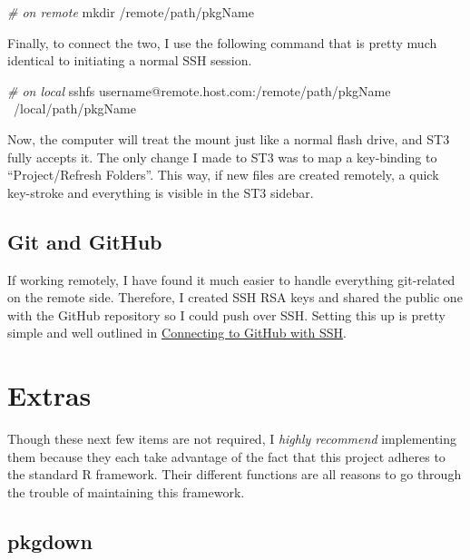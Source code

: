 \documentclass[]{book}
\newenvironment{Shaded}{\begin{snugshade}}{\end{snugshade}}
\newcommand{\CommentTok}[1]{\textcolor[rgb]{0.56,0.35,0.01}{\textit{#1}}}
\newcommand{\ExtensionTok}[1]{#1}
\newcommand{\FunctionTok}[1]{\textcolor[rgb]{0.00,0.00,0.00}{#1}}
\newcommand{\NormalTok}[1]{#1}
\begin{document}
\begin{Shaded}
\begin{Highlighting}[]
\CommentTok{# on remote}
\FunctionTok{mkdir}\NormalTok{ /remote/path/pkgName}
\end{Highlighting}
\end{Shaded}

Finally, to connect the two, I use the following command that is pretty much identical to initiating a normal SSH session.

\begin{Shaded}
\begin{Highlighting}[]
\CommentTok{# on local}
\ExtensionTok{sshfs}\NormalTok{ username@remote.host.com:/remote/path/pkgName ~/local/path/pkgName}
\end{Highlighting}
\end{Shaded}

Now, the computer will treat the mount just like a normal flash drive, and ST3 fully accepts it. The only change I made to ST3 was to map a key-binding to ``Project/Refresh Folders''. This way, if new files are created remotely, a quick key-stroke and everything is visible in the ST3 sidebar.

\hypertarget{git-and-github-1}{%
\subsection{Git and GitHub}\label{git-and-github-1}}

If working remotely, I have found it much easier to handle everything git-related on the remote side. Therefore, I created SSH RSA keys and shared the public one with the GitHub repository so I could push over SSH. Setting this up is pretty simple and well outlined in \href{https://help.github.com/en/articles/connecting-to-github-with-SSH}{Connecting to GitHub with SSH}.

\hypertarget{extras}{%
\section{Extras}\label{extras}}

Though these next few items are not required, I \emph{highly recommend} implementing them because they each take advantage of the fact that this project adheres to the standard R framework. Their different functions are all reasons to go through the trouble of maintaining this framework.

\hypertarget{pkgdown}{%
\subsection{pkgdown}\label{pkgdown}}
\end{document}
